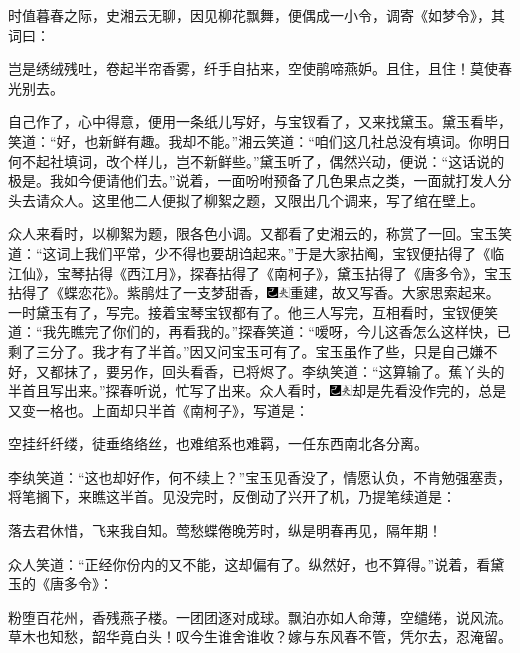 时值暮春之际，史湘云无聊，因见柳花飘舞，便偶成一小令，调寄《如梦令》，其词曰：

岂是绣绒残吐，卷起半帘香雾，纤手自拈来，空使鹃啼燕妒。且住，且住！莫使春光别去。

自己作了，心中得意，便用一条纸儿写好，与宝钗看了，又来找黛玉。黛玉看毕，笑道：``好，也新鲜有趣。我却不能。''湘云笑道：``咱们这几社总没有填词。你明日何不起社填词，改个样儿，岂不新鲜些。''黛玉听了，偶然兴动，便说：``这话说的极是。我如今便请他们去。''说着，一面吩咐预备了几色果点之类，一面就打发人分头去请众人。这里他二人便拟了柳絮之题，又限出几个调来，写了绾在壁上。

众人来看时，以柳絮为题，限各色小调。又都看了史湘云的，称赏了一回。宝玉笑道：``这词上我们平常，少不得也要胡诌起来。''于是大家拈阄，宝钗便拈得了《临江仙》，宝琴拈得《西江月》，探春拈得了《南柯子》，黛玉拈得了《唐多令》，宝玉拈得了《蝶恋花》。紫鹃炷了一支梦甜香，{\includegraphics[width=3mm]{../Images/00003}\includegraphics[width=3mm]{../Images/00012}\footnotesize \kaishu 重建，故又写香。}大家思索起来。一时黛玉有了，写完。接着宝琴宝钗都有了。他三人写完，互相看时，宝钗便笑道：``我先瞧完了你们的，再看我的。''探春笑道：``嗳呀，今儿这香怎么这样快，已剩了三分了。我才有了半首。''因又问宝玉可有了。宝玉虽作了些，只是自己嫌不好，又都抹了，要另作，回头看香，已将烬了。李纨笑道：``这算输了。蕉丫头的半首且写出来。''探春听说，忙写了出来。众人看时，{\includegraphics[width=3mm]{../Images/00003}\includegraphics[width=3mm]{../Images/00012}\footnotesize \kaishu 却是先看没作完的，总是又变一格也。}上面却只半首《南柯子》，写道是：

空挂纤纤缕，徒垂络络丝，也难绾系也难羁，一任东西南北各分离。

李纨笑道：``这也却好作，何不续上？''宝玉见香没了，情愿认负，不肯勉强塞责，将笔搁下，来瞧这半首。见没完时，反倒动了兴开了机，乃提笔续道是：

落去君休惜，飞来我自知。莺愁蝶倦晚芳时，纵是明春再见，隔年期！

众人笑道：``正经你份内的又不能，这却偏有了。纵然好，也不算得。''说着，看黛玉的《唐多令》：

粉堕百花州，香残燕子楼。一团团逐对成球。飘泊亦如人命薄，空缱绻，说风流。　　草木也知愁，韶华竟白头！叹今生谁舍谁收？嫁与东风春不管，凭尔去，忍淹留。

